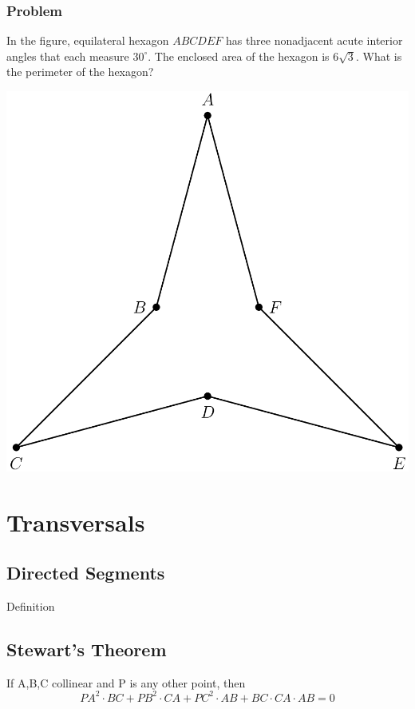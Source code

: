 \documentclass{article}
\begin{document}
\pagebreak

\subsubsection{Problem}
In the figure, equilateral hexagon $ABCDEF$ has three nonadjacent acute interior angles that each measure $30^\circ$. 
The enclosed area of the hexagon is $6\sqrt{3}$. What is the perimeter of the hexagon?

\includegraphics[scale=.4]{1.png}

\pagebreak

\section{Transversals}

\subsection{Directed Segments}
Definition
\vspace{30px}

\subsection{Stewart's Theorem}
If A,B,C collinear and P is any other point, then
$$PA^2\cdot BC+PB^2\cdot CA+PC^2\cdot AB+BC \cdot CA \cdot AB =0$$ 
\end{document}
